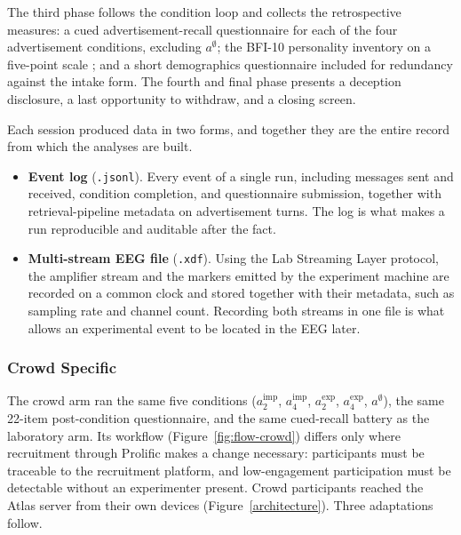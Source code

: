 \documentclass[english]{article}
\begin{document}
The third phase follows the condition loop and collects the retrospective measures: a cued advertisement-recall questionnaire for each of the four advertisement conditions, excluding \(a^{\emptyset}\); the BFI-10 personality inventory on a five-point scale \cite{rammstedt2007bfi10}; and a short demographics questionnaire included for redundancy against the intake form. The fourth and final phase presents a deception disclosure, a last opportunity to withdraw, and a closing screen.

Each session produced data in two forms, and together they are the entire record from which the analyses are built.

\begin{itemize}
    \item \textbf{Event log} (\texttt{.jsonl}). Every event of a single run, including messages sent and received, condition completion, and questionnaire submission, together with retrieval-pipeline metadata on advertisement turns. The log is what makes a run reproducible and auditable after the fact.
    \item \textbf{Multi-stream EEG file} (\texttt{.xdf}). Using the Lab Streaming Layer protocol, the amplifier stream and the markers emitted by the experiment machine are recorded on a common clock and stored together with their metadata, such as sampling rate and channel count. Recording both streams in one file is what allows an experimental event to be located in the EEG later.
\end{itemize}

\subsubsection{Crowd Specific}

The crowd arm ran the same five conditions (\(a^{\mathrm{imp}}_2\), \(a^{\mathrm{imp}}_4\), \(a^{\mathrm{exp}}_2\), \(a^{\mathrm{exp}}_4\), \(a^{\emptyset}\)), the same 22-item post-condition questionnaire, and the same cued-recall battery as the laboratory arm. Its workflow (Figure~\ref{fig:flow-crowd}) differs only where recruitment through Prolific makes a change necessary: participants must be traceable to the recruitment platform, and low-engagement participation must be detectable without an experimenter present. Crowd participants reached the Atlas server from their own devices (Figure~\ref{architecture}). Three adaptations follow.
\end{document}

